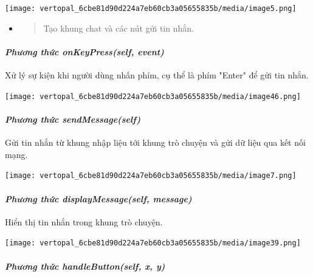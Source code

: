 \documentclass[a4paper]{article}
\begin{document}
\texttt{[image: vertopal\_6cbe81d90d224a7eb60cb3a05655835b/media/image5.png]}

\begin{itemize}
\item
  \begin{quote}
  Tạo khung chat và các nút gửi tin nhắn.
  \end{quote}
\end{itemize}

\hypertarget{phux1b0ux1a1ng-thux1ee9c-onkeypressself-event}{%
\paragraph{\texorpdfstring{\emph{Phương thức onKeyPress(self,
event)}}{Phương thức onKeyPress(self, event)}}\label{phux1b0ux1a1ng-thux1ee9c-onkeypressself-event}}

Xử lý sự kiện khi người dùng nhấn phím, cụ thể là phím "Enter" để gửi
tin nhắn.

\texttt{[image: vertopal\_6cbe81d90d224a7eb60cb3a05655835b/media/image46.png]}

\hypertarget{phux1b0ux1a1ng-thux1ee9c-sendmessageself}{%
\paragraph{\texorpdfstring{\emph{\textbf{} Phương thức
sendMessage(self)}}{Phương thức sendMessage(self)}}\label{phux1b0ux1a1ng-thux1ee9c-sendmessageself}}

Gửi tin nhắn từ khung nhập liệu tới khung trò chuyện và gửi dữ liệu qua
kết nối mạng.

\texttt{[image: vertopal\_6cbe81d90d224a7eb60cb3a05655835b/media/image7.png]}

\hypertarget{phux1b0ux1a1ng-thux1ee9c-displaymessageself-message}{%
\paragraph{\texorpdfstring{\emph{Phương thức displayMessage(self,
message)}}{Phương thức displayMessage(self, message)}}\label{phux1b0ux1a1ng-thux1ee9c-displaymessageself-message}}

Hiển thị tin nhắn trong khung trò chuyện.

\texttt{[image: vertopal\_6cbe81d90d224a7eb60cb3a05655835b/media/image39.png]}

\hypertarget{phux1b0ux1a1ng-thux1ee9c-handlebuttonself-x-y}{%
\paragraph{\texorpdfstring{\emph{\textbf{} Phương thức
handleButton(self, x,
y)}}{Phương thức handleButton(self, x, y)}}\label{phux1b0ux1a1ng-thux1ee9c-handlebuttonself-x-y}}
\end{document}
